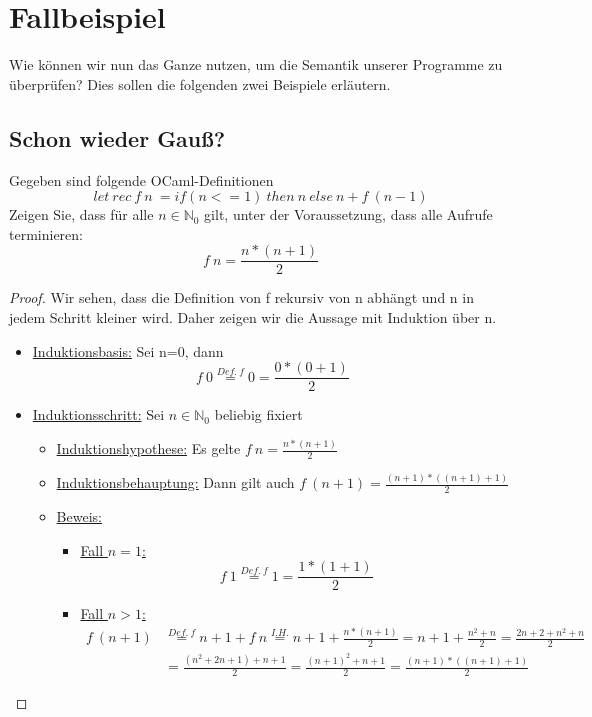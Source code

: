 \documentclass[hidelinks]{article}
\theoremstyle{plain}
\theoremstyle{definition}
\theoremstyle{rem}
\begin{document}
\begin{sloppypar}
\section{Fallbeispiel}
Wie können wir nun das Ganze nutzen, um die Semantik unserer Programme zu überprüfen? Dies sollen die folgenden zwei Beispiele erläutern.
\subsection{Schon wieder Gauß?}
Gegeben sind folgende OCaml-Definitionen
\begin{equation}
	let\ rec\ f\ n\ = if(n<=1)\ then\ n\ else\ n+f\ (n-1)
\end{equation}
Zeigen Sie, dass für alle $n\in\mathbb{N}_0$ gilt, unter der Voraussetzung, dass alle Aufrufe terminieren:
\begin{equation*}
	f\ n = \frac{n*(n+1)}{2}
\end{equation*}
\begin{proof}
Wir sehen, dass die Definition von f rekursiv von n abhängt und n in jedem Schritt kleiner wird. Daher zeigen wir die Aussage mit Induktion über n.
\begin{itemize}
\item \underline{Induktionsbasis:} Sei n=0, dann
\begin{equation*}
	f\ 0\stackrel{Def.\ f}{=}0=\frac{0*(0+1)}{2}
\end{equation*}
\item \underline{Induktionsschritt:} Sei $n\in \mathbb{N}_0$ beliebig fixiert
	\begin{itemize}
	\item \underline{Induktionshypothese:} Es gelte $f\ n=\frac{n*(n+1)}{2}$
	\item \underline{Induktionsbehauptung:} Dann gilt auch $f\ (n+1)=\frac{(n+1)*((n+1)+1)}{2}$
	\item \underline{Beweis:}
	\begin{itemize}
		\item \underline{Fall $n=1$:}
		\begin{equation*}
			f\ 1\stackrel{Def.\ f}{=}1=\frac{1*(1+1)}{2}
		\end{equation*}
		\item \underline{Fall $n>1$:}
	\begin{align*}
		f\ (n+1)&\stackrel{Def.\ f}=n+1+f\ n\stackrel{I.H.}{=}n+1+\frac{n*(n+1)}{2}=n+1+\frac{n^2+n}{2}=\frac{2n+2+n^2+n}{2}\\
		&=\frac{(n^2+2n+1)+n+1}{2}=\frac{(n+1)^2+n+1}{2}=\frac{(n+1)*((n+1)+1)}{2}
	\end{align*}
	\end{itemize}
	\end{itemize}
\end{itemize}
\end{proof}

\end{sloppypar}
\end{document}
